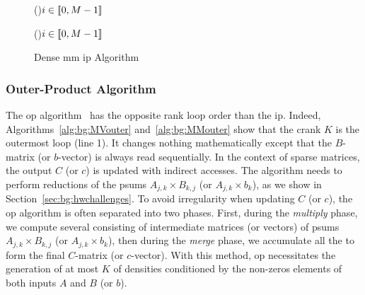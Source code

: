 \begin{figure}[htb]
    \begin{minipage}[t]{0.49\linewidth}
        \begin{algorithm}[H]
        \caption{Dense \acrlong{mv} \acrlong{ip} Algorithm}
        \label{alg:bg:MVinner}
        \For(){$i \in [\![ 0, M-1 ]\!]$}{
        }
        \end{algorithm}
    \end{minipage}
    \hfill
    \begin{minipage}[t]{0.49\linewidth}
        \begin{algorithm}[H]
        \caption{Dense \acrlong{mm} \acrlong{ip} Algorithm}
        \label{alg:bg:MMinner}
        \For(){$i \in [\![ 0, M-1 ]\!]$}{
        }
        \end{algorithm}
    \end{minipage}
\end{figure}

\subsubsection{Outer-Product Algorithm}

The \acrlong{op} algorithm~\cite{Faddeev1981_InnerOuter} has the opposite \gls{rank} loop order than the \acrlong{ip}.
Indeed, Algorithms~\ref{alg:bg:MVouter} and~\ref{alg:bg:MMouter} show that the \gls{crank} $K$ is the outermost loop (line 1).
It changes nothing mathematically except that the $B$-matrix (or $b$-vector) is always read sequentially.
In the context of sparse matrices, the output $C$ (or $c$) is updated with indirect accesses.
The algorithm needs to perform \glspl{reduction} of the \glspl{psum} $A_{j,k} \times B_{k,j}$ (or $A_{j,k} \times b_{k}$), as we show in Section~\ref{sec:bg:hwchallenges}.
To avoid irregularity when updating $C$ (or $c$), the \acrshort{op} algorithm is often separated into two phases.
First, during the \emph{multiply} phase, we compute several  consisting of intermediate matrices (or vectors) of \glspl{psum} $A_{j,k} \times B_{k,j}$ (or $A_{j,k} \times b_{k}$), then during the \emph{merge} phase, we accumulate all the  to form the final $C$-matrix (or $c$-vector).
With this method, \acrshort{op} necessitates the generation of at most $K$  of densities conditioned by the non-zeros elements of both inputs $A$ and $B$ (or $b$).


